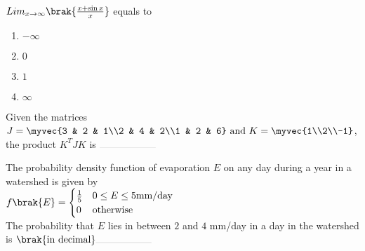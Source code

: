 \item $Lim_{x\to \infty} \brak{\frac{x+\sin x}{x}}$ equals to
\hfill{}
\begin{enumerate}
\item $-\infty$
\item $0$
\item $1$
\item $\infty$
\end{enumerate}

\item Given the matrices $J = \myvec{3 & 2 & 1\\2 & 4 & 2\\1 & 2 & 6} \text{ and } K = \myvec{1\\2\\-1}$, the product $K^T JK$ is $\rule{2cm}{0.1pt}$
\hfill{}

\item The probability density function of evaporation $E$ on any day during a year in a watershed is given by\\
$f\brak{E} = 
\begin{cases}
\frac{1}{5} & 0\leq E \leq 5 \text{mm/day}\\
0 & \text{otherwise}
\end{cases}$\\
The probability that $E$ lies in between $2$ and $4$ mm/day in a day in the watershed is $\brak{\text{in decimal}}\rule{2cm}{0.1pt}$
\hfill{}

